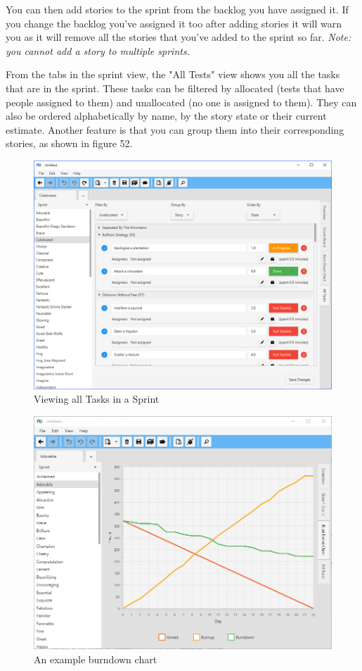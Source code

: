 You can then add stories to the sprint from the backlog you have assigned it. If you change the backlog you've assigned it too after adding stories it will warn you as it will remove all the stories that you've added to the sprint so far.\newline
\textit{Note: you cannot add a story to multiple sprints.}

From the tabs in the sprint view, the "All Tests" view shows you all the tasks that are in the sprint. These tasks can be filtered by allocated (tests that have people assigned to them) and unallocated (no one is assigned to them). They can also be ordered alphabetically by name, by the story state or their current estimate. Another feature is that you can group them into their corresponding stories, as shown in figure 52.

\begin{figure}[H]
\centering
\includegraphics[width=\textwidth]{images/screenshots/sprint2.PNG}
\caption{Viewing all Tasks in a Sprint}
\label{fig:new_project}
\end{figure}

\begin{figure}[H]
\centering
\includegraphics[width=\textwidth]{images/screenshots/burndown.png}
\caption{An example burndown chart}
\label{fig:burndown}
\end{figure}

